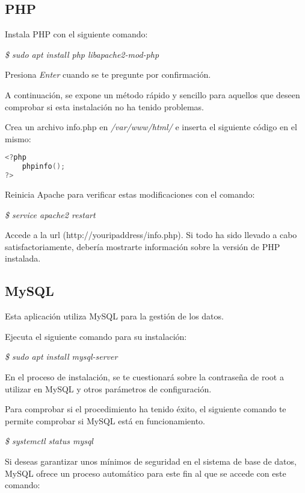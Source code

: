\documentclass[11pt,spanish,
		listoftables,listoffigures]
		{tfgplantilla}
\begin{document}
\subsection {PHP}

Instala PHP con el siguiente comando:

\textit {\$ sudo apt install php libapache2-mod-php}

Presiona \textit {Enter} cuando se te pregunte por confirmación.

A continuación, se expone un método rápido y sencillo para aquellos que deseen comprobar si esta instalación no ha tenido problemas.

Crea un archivo \textquotedbl  info.php\textquotedbl{} en \textit {/var/www/html/} e inserta el siguiente código en el mismo:

\begin{center}
\begin{lstlisting}[language=C]
<?php
	phpinfo();
?>
\end{lstlisting}
\end{center}

Reinicia Apache para verificar estas modificaciones con el comando:

\textit {\$ service apache2 restart}

Accede a la url (http://youripaddress/info.php). Si todo ha sido llevado a cabo satisfactoriamente, debería mostrarte información sobre la versión de PHP instalada.

\subsection {MySQL}

Esta aplicación utiliza MySQL para la gestión de los datos. 

Ejecuta el siguiente comando para su instalación:

\textit {\$ sudo apt install mysql-server}

En el proceso de instalación, se te cuestionará sobre la contraseña de root a utilizar en MySQL y otros parámetros de configuración. 

Para comprobar si el procedimiento ha tenido éxito, el siguiente comando te permite comprobar si MySQL está en funcionamiento.

\textit {\$ systemctl status mysql}

Si deseas garantizar unos mínimos de seguridad en el sistema de base de datos, MySQL ofrece un proceso automático para este fin al que se accede con este comando:
\end{document}
